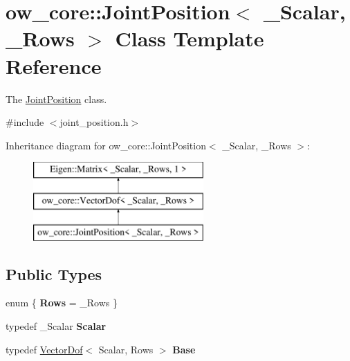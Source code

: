 \hypertarget{classow__core_1_1JointPosition}{}\section{ow\+\_\+core\+:\+:Joint\+Position$<$ \+\_\+\+Scalar, \+\_\+\+Rows $>$ Class Template Reference}
\label{classow__core_1_1JointPosition}


The \hyperlink{classow__core_1_1JointPosition}{Joint\+Position} class.  




{\ttfamily \#include $<$joint\+\_\+position.\+h$>$}

Inheritance diagram for ow\+\_\+core\+:\+:Joint\+Position$<$ \+\_\+\+Scalar, \+\_\+\+Rows $>$\+:\begin{figure}[H]
\begin{center}
\leavevmode
\includegraphics[height=3.000000cm]{da/d8e/classow__core_1_1JointPosition}
\end{center}
\end{figure}
\subsection*{Public Types}
\begin{DoxyCompactItemize}
\item 
enum \{ {\bfseries Rows} = \+\_\+\+Rows
 \}\hypertarget{classow__core_1_1JointPosition_a3bce0f7c54dfdda7d37141ac774d7a1c}{}\label{classow__core_1_1JointPosition_a3bce0f7c54dfdda7d37141ac774d7a1c}

\item 
typedef \+\_\+\+Scalar {\bfseries Scalar}\hypertarget{classow__core_1_1JointPosition_a1de340b233a2013396d800259b8fea54}{}\label{classow__core_1_1JointPosition_a1de340b233a2013396d800259b8fea54}

\item 
typedef \hyperlink{classow__core_1_1VectorDof}{Vector\+Dof}$<$ Scalar, Rows $>$ {\bfseries Base}\hypertarget{classow__core_1_1JointPosition_ad4e97b6ef198bc876f4ced4645de5403}{}\label{classow__core_1_1JointPosition_ad4e97b6ef198bc876f4ced4645de5403}

\end{DoxyCompactItemize}

